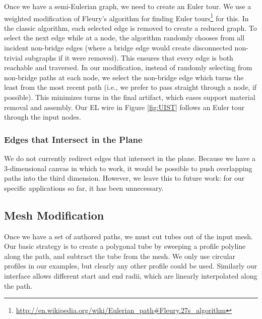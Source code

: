 Once we have a semi-Eulerian graph, we need to create an Euler tour.  We use a weighted modification of Fleury's algorithm for finding Euler tours\footnote{\url{http://en.wikipedia.org/wiki/Eulerian_path\#Fleury.27s_algorithm}} for this.  In the classic algorithm, each selected edge is removed to create a reduced graph.  To select the next edge while at a node, the algorithm randomly chooses from all incident non-bridge edges (where a bridge edge would create disconnected non-trivial subgraphs if it were removed).  This ensures that every edge is both reachable and traversed.  In our modification, instead of randomly selecting from non-bridge paths at each node, we select the non-bridge edge which turns the least from the most recent path (i.e., we prefer to pass straight through a node, if possible).  This minimizes turns in the final artifact, which eases support material removal and assembly.  Our EL wire in Figure \ref{fig:UIST} follows an Euler tour through the input nodes.

\subsubsection{Edges that Intersect in the Plane}
We do not currently redirect edges that intersect in the plane.  Because we have a 3-dimensional canvas in which to work, it would be possible to push overlapping paths into the third dimension.  However, we leave this to future work: for our specific applications so far, it has been unnecessary.

\subsection{Mesh Modification}
Once we have a set of authored paths, we must cut tubes out of the input mesh.
Our basic strategy is to create a polygonal tube by sweeping a profile polyline
along the path, and subtract the tube from the mesh. We only use circular profiles
in our examples, but clearly any other profile could be used. Similarly our interface
allows different start and end radii, which are linearly interpolated along the path.


